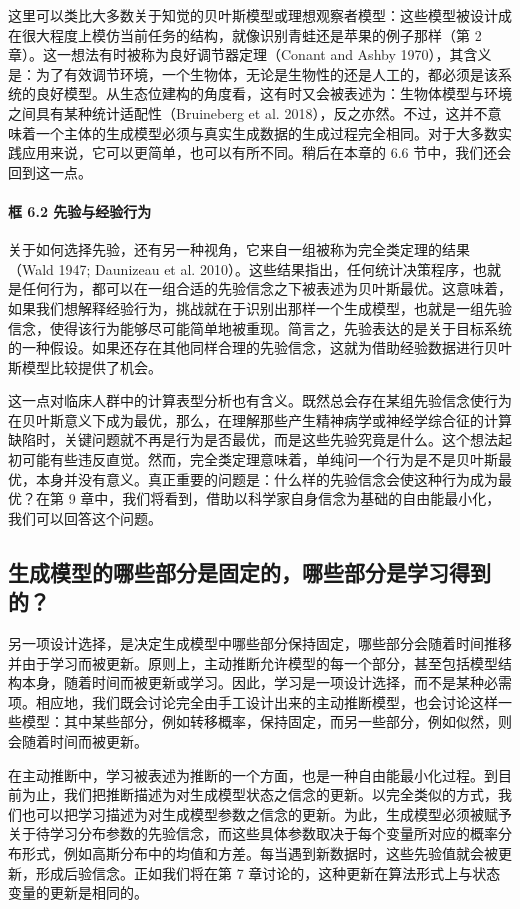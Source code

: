这里可以类比大多数关于知觉的贝叶斯模型或理想观察者模型：这些模型被设计成在很大程度上模仿当前任务的结构，就像识别青蛙还是苹果的例子那样（第 2 章）。这一想法有时被称为良好调节器定理（Conant and Ashby 1970），其含义是：为了有效调节环境，一个生物体，无论是生物性的还是人工的，都必须是该系统的良好模型。从生态位建构的角度看，这有时又会被表述为：生物体模型与环境之间具有某种统计适配性（Bruineberg et al. 2018），反之亦然。不过，这并不意味着一个主体的生成模型必须与真实生成数据的生成过程完全相同。对于大多数实践应用来说，它可以更简单，也可以有所不同。稍后在本章的 6.6 节中，我们还会回到这一点。

\paragraph{框 6.2 先验与经验行为}

关于如何选择先验，还有另一种视角，它来自一组被称为完全类定理的结果（Wald 1947; Daunizeau et al. 2010）。这些结果指出，任何统计决策程序，也就是任何行为，都可以在一组合适的先验信念之下被表述为贝叶斯最优。这意味着，如果我们想解释经验行为，挑战就在于识别出那样一个生成模型，也就是一组先验信念，使得该行为能够尽可能简单地被重现。简言之，先验表达的是关于目标系统的一种假设。如果还存在其他同样合理的先验信念，这就为借助经验数据进行贝叶斯模型比较提供了机会。

这一点对临床人群中的计算表型分析也有含义。既然总会存在某组先验信念使行为在贝叶斯意义下成为最优，那么，在理解那些产生精神病学或神经学综合征的计算缺陷时，关键问题就不再是行为是否最优，而是这些先验究竟是什么。这个想法起初可能有些违反直觉。然而，完全类定理意味着，单纯问一个行为是不是贝叶斯最优，本身并没有意义。真正重要的问题是：什么样的先验信念会使这种行为成为最优？在第 9 章中，我们将看到，借助以科学家自身信念为基础的自由能最小化，我们可以回答这个问题。

\subsection{生成模型的哪些部分是固定的，哪些部分是学习得到的？}

另一项设计选择，是决定生成模型中哪些部分保持固定，哪些部分会随着时间推移并由于学习而被更新。原则上，主动推断允许模型的每一个部分，甚至包括模型结构本身，随着时间而被更新或学习。因此，学习是一项设计选择，而不是某种必需项。相应地，我们既会讨论完全由手工设计出来的主动推断模型，也会讨论这样一些模型：其中某些部分，例如转移概率，保持固定，而另一些部分，例如似然，则会随着时间而被更新。

在主动推断中，学习被表述为推断的一个方面，也是一种自由能最小化过程。到目前为止，我们把推断描述为对生成模型状态之信念的更新。以完全类似的方式，我们也可以把学习描述为对生成模型参数之信念的更新。为此，生成模型必须被赋予关于待学习分布参数的先验信念，而这些具体参数取决于每个变量所对应的概率分布形式，例如高斯分布中的均值和方差。每当遇到新数据时，这些先验值就会被更新，形成后验信念。正如我们将在第 7 章讨论的，这种更新在算法形式上与状态变量的更新是相同的。

